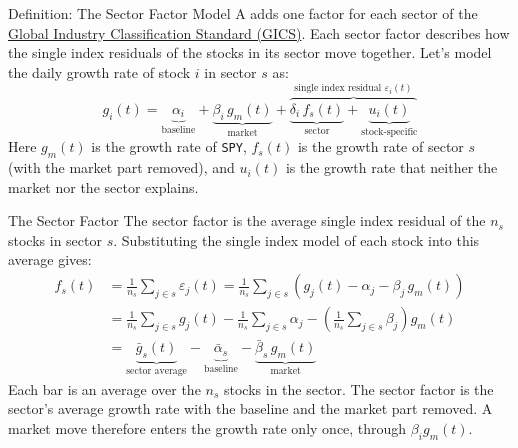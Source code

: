 \documentclass[aspectratio=169,11pt]{beamer}
\begin{document}
\begin{frame}{Definition: The Sector Factor Model}
  A  adds one factor for each sector of the
  \href{https://www.msci.com/our-solutions/indexes/gics}{Global Industry Classification Standard (GICS)}.
  Each sector factor describes how the single index residuals of the stocks in its sector move
  together. Let's model the daily growth rate of stock $i$ in sector $s$ as:
  \begin{equation*}
    g_{i}(t)=\underbrace{\alpha_{i}}_{\textstyle\text{baseline}}+\underbrace{\beta_{i}\,g_{m}(t)}_{\textstyle\text{market}}+\overbrace{\underbrace{\delta_{i}\,f_{s}(t)}_{\textstyle\text{sector}}+\underbrace{u_{i}(t)}_{\textstyle\text{stock-specific}}}^{\textstyle\text{single index residual }\varepsilon_{i}(t)}
  \end{equation*}
  Here $g_m(t)$ is the growth rate of \texttt{SPY}, $f_s(t)$ is the growth rate of sector $s$
  (with the market part removed), and $u_i(t)$ is the growth rate that neither the market nor the
  sector explains.
\end{frame}

\begin{frame}{The Sector Factor}
  The sector factor is the average single index residual of the $n_s$ stocks in sector $s$.
  Substituting the single index model of each stock into this average gives:
  \begin{align*}
    f_{s}(t) &= \frac{1}{n_{s}}\sum_{j\in s}\varepsilon_{j}(t)
    = \frac{1}{n_{s}}\sum_{j\in s}\left(g_{j}(t)-\alpha_{j}-\beta_{j}\,g_{m}(t)\right)\\
    &= \frac{1}{n_{s}}\sum_{j\in s}g_{j}(t)-\frac{1}{n_{s}}\sum_{j\in s}\alpha_{j}-\left(\frac{1}{n_{s}}\sum_{j\in s}\beta_{j}\right)g_{m}(t)\\
    &= \underbrace{\bar{g}_{s}(t)}_{\textstyle\text{sector average}}-\underbrace{\bar{\alpha}_{s}}_{\textstyle\text{baseline}}-\underbrace{\bar{\beta}_{s}\,g_{m}(t)}_{\textstyle\text{market}}
  \end{align*}
  Each bar is an average over the $n_s$ stocks in the sector. The sector factor is the sector's
  average growth rate with the baseline and the market part removed. A market move therefore
  enters the growth rate only once, through $\beta_i g_m(t)$.
\end{frame}
\end{document}
